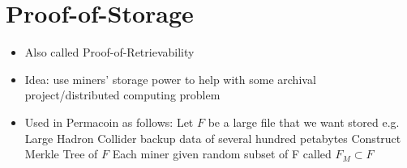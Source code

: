 \documentclass{article}
\begin{document}
\section{Proof-of-Storage}
\begin{itemize}
\item Also called Proof-of-Retrievability
\item Idea: use miners' storage power to help with some archival project/distributed computing problem
\item Used in Permacoin as follows:
\subitem Let $F$ be a large file that we want stored e.g. Large Hadron Collider backup data of several hundred petabytes
\subitem Construct Merkle Tree of $F$
\subitem Each miner given random subset of F called $F_M \subset F$
\end{itemize}
\end{document}
